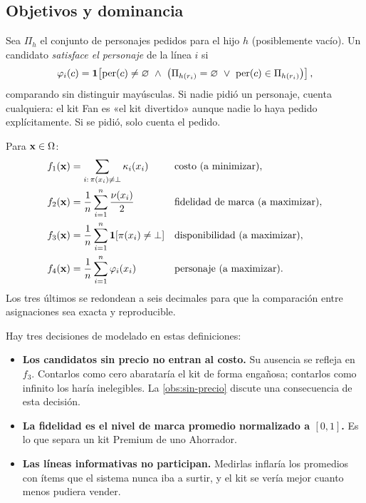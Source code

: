 \subsection{Objetivos y dominancia}
\label{sec:opt-objetivos}

Sea $\Pi_h$ el conjunto de personajes pedidos para el hijo $h$ (posiblemente
vacío). Un candidato \emph{satisface el personaje} de la línea $i$ si
\[
  \varphi_i(c)=\ind{\mathrm{per}(c)\neq\varnothing\ \wedge\ \bigl(\Pi_{h(r_i)}=\varnothing
  \ \vee\ \mathrm{per}(c)\in\Pi_{h(r_i)}\bigr)},
\]
comparando sin distinguir mayúsculas. Si nadie pidió un personaje, cuenta
cualquiera: el kit Fan es «el kit divertido» aunque nadie lo haya pedido
explícitamente. Si se pidió, solo cuenta el pedido.

\begin{definicion}[Objetivos]
\label{def:objetivos}
Para $\mathbf{x}\in\Omega$:
\begin{align*}
  f_1(\mathbf{x}) &= \sum_{i:\,\pi(x_i)\neq\bot}\kappa_i(x_i)
    && \text{costo (a minimizar)},\\
  f_2(\mathbf{x}) &= \frac{1}{n}\sum_{i=1}^n\frac{\nu(x_i)}{2}
    && \text{fidelidad de marca (a maximizar)},\\
  f_3(\mathbf{x}) &= \frac{1}{n}\sum_{i=1}^n\mathbf{1}\!\left[\pi(x_i)\neq\bot\right]
    && \text{disponibilidad (a maximizar)},\\
  f_4(\mathbf{x}) &= \frac{1}{n}\sum_{i=1}^n\varphi_i(x_i)
    && \text{personaje (a maximizar)}.
\end{align*}
Los tres últimos se redondean a seis decimales para que la comparación entre
asignaciones sea exacta y reproducible.
\end{definicion}

Hay tres decisiones de modelado en estas definiciones:
\begin{itemize}
  \item \textbf{Los candidatos sin precio no entran al costo.} Su ausencia se
        refleja en $f_3$. Contarlos como cero abarataría el kit de forma
        engañosa; contarlos como infinito los haría inelegibles. La
        \cref{obs:sin-precio} discute una consecuencia de esta decisión.
  \item \textbf{La fidelidad es el nivel de marca promedio normalizado a
        $[0,1]$.} Es lo que separa un kit Premium de uno Ahorrador.
  \item \textbf{Las líneas informativas no participan.} Medirlas inflaría los
        promedios con ítems que el sistema nunca iba a surtir, y el kit se
        vería mejor cuanto menos pudiera vender.
\end{itemize}

